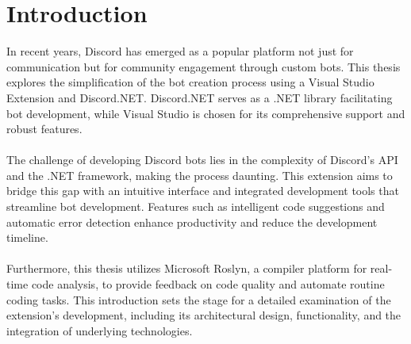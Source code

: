 \section{Introduction}
\label{sec:Introduction}
In recent years, Discord has emerged as a popular platform not just for communication but for community engagement through custom bots. This thesis explores the simplification of the bot creation process using a Visual Studio Extension and Discord.NET. Discord.NET serves as a .NET library facilitating bot development, while Visual Studio is chosen for its comprehensive support and robust features.\\\\
The challenge of developing Discord bots lies in the complexity of Discord's API and the .NET framework, making the process daunting. This extension aims to bridge this gap with an intuitive interface and integrated development tools that streamline bot development. Features such as intelligent code suggestions and automatic error detection enhance productivity and reduce the development timeline.\\\\
Furthermore, this thesis utilizes Microsoft Roslyn, a compiler platform for real-time code analysis, to provide feedback on code quality and automate routine coding tasks. This introduction sets the stage for a detailed examination of the extension's development, including its architectural design, functionality, and the integration of underlying technologies.